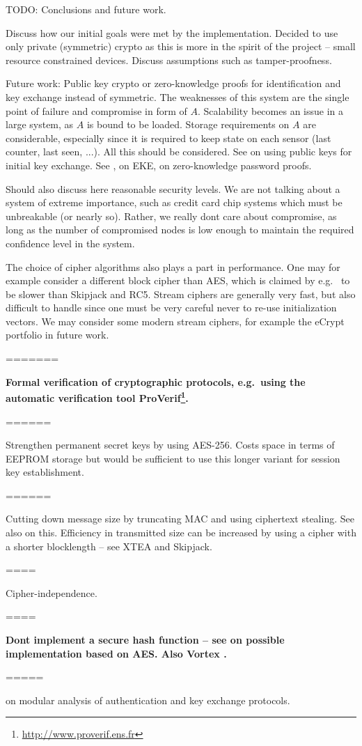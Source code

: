 TODO: Conclusions and future work.

Discuss how our initial goals were met by the implementation. Decided to use only private (symmetric) crypto as this is more in the spirit of the project -- small resource constrained devices. Discuss assumptions such as tamper-proofness.

Future work: Public key crypto or zero-knowledge proofs for identification and key exchange instead of symmetric. The weaknesses of this system are the single point of failure and compromise in form of $A$. Scalability becomes an issue in a large system, as $A$ is bound to be loaded. Storage requirements on $A$ are considerable, especially since it is required to keep state on each sensor (last counter, last seen, ...). All this should be considered. See \cite{rfc-4556-2006} on using public keys for initial key exchange.
See \cite{bellovin1992}, \cite{bellovin1993} on EKE, \cite{wu1997} on zero-knowledge password proofs. 

Should also discuss here reasonable security levels. We are not talking about a system of extreme importance, such as credit card chip systems which must be unbreakable (or nearly so). Rather, we really dont care about compromise, as long as the number of compromised nodes is low enough to maintain the required confidence level in the system.

The choice of cipher algorithms also plays a part in performance. One may for example consider a different block cipher than AES, which is claimed by e.g.\  to be slower than Skipjack and RC5. Stream ciphers are generally very fast, but also difficult to handle since one must be very careful never to re-use initialization vectors. We may consider some modern stream ciphers, for example the eCrypt portfolio in future work.


=======

\textbf{Formal verification of cryptographic protocols, e.g.\ using the automatic verification tool ProVerif\footnote{\url{http://www.proverif.ens.fr}}.}


======

Strengthen permanent secret keys by using AES-256. Costs space in terms of EEPROM storage but would be sufficient to use this longer variant for session key establishment.

======

Cutting down message size by truncating MAC and using ciphertext stealing. See also \cite{karlof2004} on this.
Efficiency in transmitted size can be increased by using a cipher with a shorter blocklength -- see XTEA and Skipjack.

====

Cipher-independence.

====

\textbf{Dont implement a secure hash function -- see \cite{cohen2001} on possible implementation based on AES. Also Vortex \cite{gueron2008}.}


=====

\cite{bellare1998a} on modular analysis of authentication and key exchange protocols.